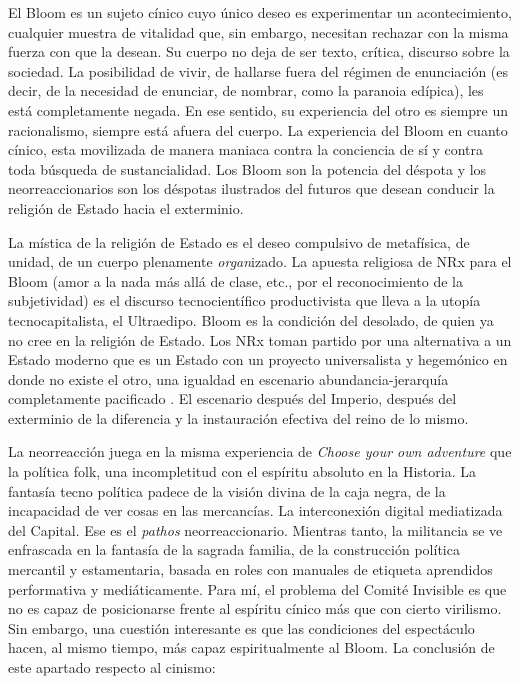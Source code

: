 El Bloom es un sujeto cínico cuyo único deseo es experimentar un acontecimiento, cualquier muestra de vitalidad que, sin embargo, necesitan rechazar con la misma fuerza con que la desean. Su cuerpo no deja de ser texto, crítica, discurso sobre la sociedad. La posibilidad de vivir, de hallarse fuera del régimen de enunciación (es decir, de la necesidad de enunciar, de nombrar, como la paranoia edípica), les está completamente negada. En ese sentido, su experiencia del otro es siempre un racionalismo, siempre está afuera del cuerpo. La experiencia del Bloom en cuanto cínico, esta movilizada de manera maniaca contra la conciencia de sí y contra toda búsqueda de sustancialidad. Los Bloom son la potencia del déspota y los neorreaccionarios son los déspotas ilustrados del futuros que desean conducir la religión de Estado hacia el exterminio.

La mística de la religión de Estado es el deseo compulsivo de metafísica, de unidad, de un cuerpo plenamente \emph{organ}izado. La apuesta religiosa de NRx para el Bloom (amor a la nada más allá de clase, etc., por el reconocimiento de la subjetividad) es el discurso tecnocientífico productivista que lleva a la utopía tecnocapitalista, el Ultraedipo. Bloom es la condición del desolado, de quien ya no cree en la religión de Estado. Los NRx toman partido por una alternativa a un Estado moderno que es un Estado con un proyecto universalista y hegemónico en donde no existe el otro, una igualdad en escenario abundancia-jerarquía completamente pacificado \autocite{fraseFourFutures2011,fraseFourFuturesVisions2016}. El escenario después del Imperio, después del exterminio de la diferencia y la instauración efectiva del reino de lo mismo.

La neorreacción juega en la misma experiencia de \emph{Choose your own adventure} que la política folk, una incompletitud con el espíritu absoluto en la Historia. La fantasía tecno política padece de la visión divina de la caja negra, de la incapacidad de ver cosas en las mercancías. La interconexión digital mediatizada del Capital. Ese es el \emph{pathos} neorreaccionario. Mientras tanto, la militancia se ve enfrascada en la fantasía de la sagrada familia, de la construcción política mercantil y estamentaria, basada en roles con manuales de etiqueta aprendidos performativa y mediáticamente. Para mí, el problema del Comité Invisible es que no es capaz de posicionarse frente al espíritu cínico más que con cierto virilismo. Sin embargo, una cuestión interesante es que las condiciones del espectáculo hacen, al mismo tiempo, más capaz espiritualmente al Bloom. La conclusión de este apartado respecto al cinismo:

